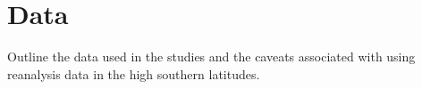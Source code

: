 \section{Data}

Outline the data used in the studies and the caveats associated with using reanalysis data in the high southern latitudes.